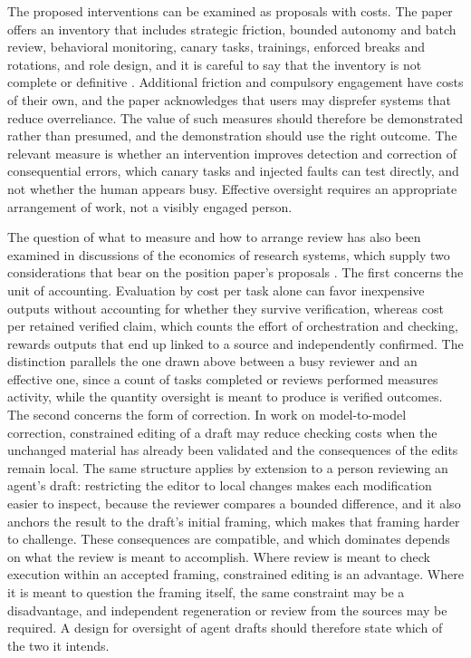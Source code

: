 \documentclass[11pt]{article}
\begin{document}
The proposed interventions can be examined as proposals with costs. The paper offers an inventory that includes strategic friction, bounded autonomy and batch review, behavioral monitoring, canary tasks, trainings, enforced breaks and rotations, and role design, and it is careful to say that the inventory is not complete or definitive \cite{mitchell}. Additional friction and compulsory engagement have costs of their own, and the paper acknowledges that users may disprefer systems that reduce overreliance. The value of such measures should therefore be demonstrated rather than presumed, and the demonstration should use the right outcome. The relevant measure is whether an intervention improves detection and correction of consequential errors, which canary tasks and injected faults can test directly, and not whether the human appears busy. Effective oversight requires an appropriate arrangement of work, not a visibly engaged person.

The question of what to measure and how to arrange review has also been examined in discussions of the economics of research systems, which supply two considerations that bear on the position paper's proposals \cite{tokenbudget}. The first concerns the unit of accounting. Evaluation by cost per task alone can favor inexpensive outputs without accounting for whether they survive verification, whereas cost per retained verified claim, which counts the effort of orchestration and checking, rewards outputs that end up linked to a source and independently confirmed. The distinction parallels the one drawn above between a busy reviewer and an effective one, since a count of tasks completed or reviews performed measures activity, while the quantity oversight is meant to produce is verified outcomes. The second concerns the form of correction. In work on model-to-model correction, constrained editing of a draft may reduce checking costs when the unchanged material has already been validated and the consequences of the edits remain local. The same structure applies by extension to a person reviewing an agent's draft: restricting the editor to local changes makes each modification easier to inspect, because the reviewer compares a bounded difference, and it also anchors the result to the draft's initial framing, which makes that framing harder to challenge. These consequences are compatible, and which dominates depends on what the review is meant to accomplish. Where review is meant to check execution within an accepted framing, constrained editing is an advantage. Where it is meant to question the framing itself, the same constraint may be a disadvantage, and independent regeneration or review from the sources may be required. A design for oversight of agent drafts should therefore state which of the two it intends.
\end{document}
